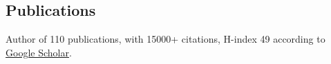 \documentclass[reqno,11pt]{article}
\let\mysec\subsubsection
\newcommand{\present}{}
\newcommand{\npind}{\hangindent\parindent
  \noindent}
\let\mysec\subsubsection
\theoremstyle{plain}
\begin{document}








\newpage












\renewcommand{\textsf}[1]{[#1]}
\subsection*{Publications}
\renewcommand{\thefootnote}{\fnsymbol{footnote}}
Author of 110 publications, 
with 15000+ citations, H-index 49 according to 
\href{https://scholar.google.com/citations?hl=en&user=w7qH1YYAAAAJ&view_op=list_works&sortby=pubdate}{Google Scholar}.\\
\end{document}
